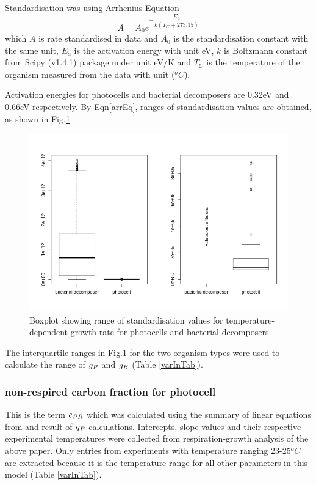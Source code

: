 \documentclass[../thesis.tex]{subfiles} %
\begin{document}
Standardisation was using Arrhenius Equation
\begin{equation}
    A = A_0e^{-\dfrac{E_a}{k(T_C+273.15)}}
    \label{arrEq}
\end{equation}
which $A$ is rate standardised in data and $A_0$ is the standardisation constant with the same unit, $E_a$ is the activation energy with unit eV, $k$ is Boltzmann constant from Scipy (v1.4.1) package under unit eV/K and $T_C$ is the temperature of the organism measured from the data with unit ($^oC$).

Activation energies for photocells and bacterial decomposers are 0.32eV and 0.66eV respectively.\autocite{regaudie2012temperature}  By Eqn\ref{arrEq}, ranges of standardisation values are obtained, as shown in Fig.\ref{growStdVal}

\begin{figure}[H]
    \centering
    \includegraphics[width=.8\linewidth]{result/stdCst.png}
    \caption[Boxplot of standardisation growth rates]{Boxplot showing range of standardisation values for temperature-dependent growth rate for photocells and bacterial decomposers}
    \label{growStdVal}
\end{figure}

The interquartile ranges in Fig.\ref{growStdVal} for the two organism types were used to calculate the range of $g_P$ and $g_B$ (Table \ref{varInTab}).

\subsubsection{non-respired carbon fraction for photocell}
This is the term $e_{PR}$ which was calculated using the summary of linear equations from \autocite{j1989respiration} and result of $g_P$ calculations.  Intercepts, slope values and their respective experimental temperatures were collected from respiration-growth analysis of the above paper.  Only entries from experiments with temperature ranging 23-25$^oC$ are extracted because it is the temperature range for all other parameters in this model (Table \ref{varInTab}).
\end{document}
